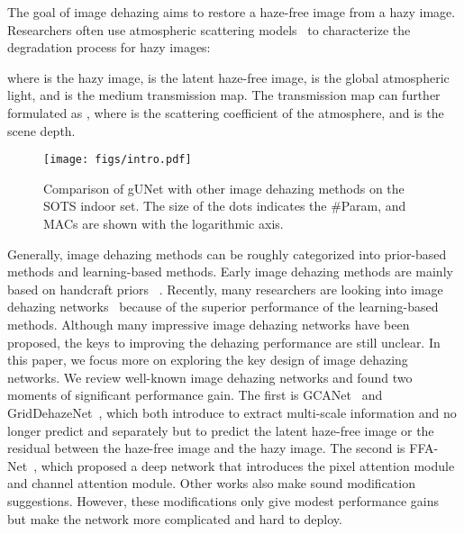 \documentclass[10pt,twocolumn,letterpaper]{article}
\begin{document}
The goal of image dehazing aims to restore a haze-free image from a hazy image.
Researchers often use atmospheric scattering models~\cite{mccartney1976optics,nayar1999vision,narasimhan2002vision} to characterize the degradation process for hazy images:

where  is the hazy image,  is the latent haze-free image,  is the global atmospheric light, and  is the medium transmission map.
The transmission map  can further formulated as , where  is the scattering coefficient of the atmosphere, and  is the scene depth.

\begin{figure}[t]
    \centering
    \texttt{[image: figs/intro.pdf]}
    \caption{
        Comparison of gUNet with other image dehazing methods on the SOTS indoor set.
        The size of the dots indicates the \#Param, and MACs are shown with the logarithmic axis.
    }
    \label{fig:intro}
\end{figure}

Generally, image dehazing methods can be roughly categorized into prior-based methods and learning-based methods.
Early image dehazing methods are mainly based on handcraft priors ~\cite{he2010single,zhu2015fast,fattal2014dehazing,berman2016non}. 
Recently, many researchers are looking into image dehazing networks~\cite{cai2016dehazenet,li2017aod,qin2020ffa,song2022vision} because of the superior performance of the learning-based methods.
Although many impressive image dehazing networks have been proposed, the keys to improving the dehazing performance are still unclear. 
In this paper, we focus more on exploring the key design of image dehazing networks.
We review well-known image dehazing networks and found two moments of significant performance gain.
The first is GCANet~\cite{chen2019gated} and GridDehazeNet~\cite{liu2019griddehazenet}, which both introduce to extract multi-scale information and no longer predict  and  separately but to predict the latent haze-free image or the residual between the haze-free image and the hazy image.
The second is FFA-Net~\cite{qin2020ffa}, which proposed a deep network that introduces the pixel attention module and channel attention module.
Other works also make sound modification suggestions.
However, these modifications only give modest performance gains but make the network more complicated and hard to deploy.
\end{document}
